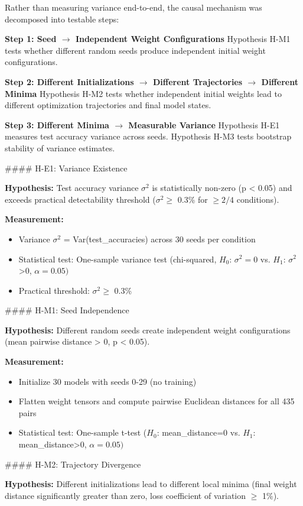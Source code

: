 Rather than measuring variance end-to-end, the causal mechanism was decomposed into testable steps:

\textbf{Step 1: Seed $\rightarrow$ Independent Weight Configurations}
Hypothesis H-M1 tests whether different random seeds produce independent initial weight configurations.

\textbf{Step 2: Different Initializations $\rightarrow$ Different Trajectories $\rightarrow$ Different Minima}
Hypothesis H-M2 tests whether independent initial weights lead to different optimization trajectories and final model states.

\textbf{Step 3: Different Minima $\rightarrow$ Measurable Variance}
Hypothesis H-E1 measures test accuracy variance across seeds.
Hypothesis H-M3 tests bootstrap stability of variance estimates.

\#\#\#\# H-E1: Variance Existence

\textbf{Hypothesis:} Test accuracy variance $\sigma ^2$ is statistically non-zero (p < 0.05) and exceeds practical detectability threshold ($\sigma ^2 \geq$ 0.3\% for $\geq 2/4$ conditions).

\textbf{Measurement:}
\begin{itemize}
\item Variance $\sigma ^2$ = Var(test\_accuracies) across 30 seeds per condition
\item Statistical test: One-sample variance test (chi-squared, $H_0$: $\sigma ^{2}=0$ vs. $H_1$: $\sigma ^2$>0, $\alpha =0.05)$
\item Practical threshold: $\sigma ^2 \geq$ 0.3\%
\end{itemize}

\#\#\#\# H-M1: Seed Independence

\textbf{Hypothesis:} Different random seeds create independent weight configurations (mean pairwise distance > 0, p < 0.05).

\textbf{Measurement:}
\begin{itemize}
\item Initialize 30 models with seeds 0-29 (no training)
\item Flatten weight tensors and compute pairwise Euclidean distances for all 435 pairs
\item Statistical test: One-sample t-test ($H_0$: mean\_distance=0 vs. $H_1$: mean\_distance>0, $\alpha =0.05)$
\end{itemize}

\#\#\#\# H-M2: Trajectory Divergence

\textbf{Hypothesis:} Different initializations lead to different local minima (final weight distance significantly greater than zero, loss coefficient of variation $\geq$ 1\%).

